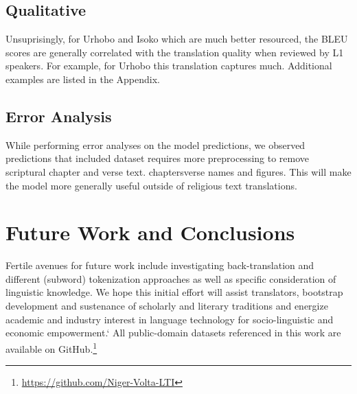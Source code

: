 \documentclass{article} %
\begin{document}
\subsection{Qualitative}

Unsuprisingly, for Urhobo and Isoko which are much better resourced, the BLEU scores are generally correlated with the translation quality when reviewed by L1 speakers. For example, for Urhobo this translation captures much. Additional examples are listed in the Appendix.

\subsection{Error Analysis}
While performing error analyses on the model predictions, we observed predictions that included  dataset requires more preprocessing to remove scriptural chapter and verse text.  chapters\/verse names and figures. This will make the model more generally useful outside of religious text translations.

\section{Future Work and Conclusions}
Fertile avenues for future work include investigating back-translation and different (subword) tokenization approaches as well as specific consideration of linguistic knowledge. We hope this initial effort will  assist translators, bootstrap development and sustenance of scholarly and literary traditions and energize academic and industry interest in language technology for socio-linguistic and economic empowerment.` All public-domain datasets referenced in this work are available on GitHub.\footnote{\url{https://github.com/Niger-Volta-LTI}}
 
% 
\end{document}
